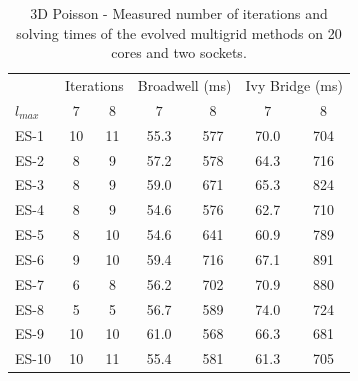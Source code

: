 \begin{table}
	\caption{3D Poisson - Measured number of iterations and solving times of the evolved multigrid methods on 20 cores and two sockets.}
	\label{table:poisson-3D-evolved-methods}
	\centering
	\begin{tabular}{l c c c c c c}
		\toprule
		& \multicolumn{2}{c}{Iterations} & \multicolumn{2}{c}{Broadwell (ms)} & \multicolumn{2}{c}{Ivy Bridge (ms)} \\
		\cmidrule(r){2-3} \cmidrule(r){4-5} \cmidrule(r){6-7}
		$l_{max}$ & $7$& $8$ & $7$ & $8$ & $7$ & $8$\\
		\midrule
		ES-1 & 10 & 11 & 55.3 & 577 & 70.0 & 704\\
		\midrule
		ES-2 & 8 & 9 & 57.2 & 578 & 64.3 & 716 \\
		\midrule
		ES-3 & 8 & 9 & 59.0 & 671 & 65.3 & 824 \\
		\midrule
		ES-4 & 8 & 9 & 54.6 & 576 & 62.7 & 710 \\
		\midrule
		ES-5 & 8 & 10 & 54.6 & 641 & 60.9 & 789 \\
		\midrule
		ES-6 & 9 & 10 & 59.4 & 716 & 67.1 & 891 \\
		\midrule
		ES-7 & 6 & 8 & 56.2 & 702 & 70.9 & 880 \\
		\midrule
		ES-8 & 5 & 5 & 56.7 & 589 & 74.0 & 724 \\
		\midrule
		ES-9 & 10 & 10 & 61.0 & 568 & 66.3 & 681 \\
		\midrule
		ES-10 & 10 & 11 & 55.4 & 581 & 61.3 & 705 \\
		\bottomrule
	\end{tabular}
\end{table}
